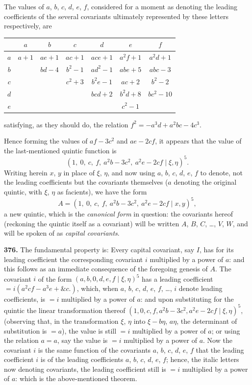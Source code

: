 \documentclass[12pt,a4paper]{article}
\begin{document}
The values of $a$, $b$, $c$, $d$, $e$, $f$, considered for a moment as denoting the leading coefficients of the several covariants ultimately represented by these letters respectively, are
\begin{center}
\begin{tabular}{c|cccccc}
& $a$ & $b$ & $c$ & $d$ & $e$ & $f$ \\[2pt]
\hline
$a$ & $a+1$ & $ae+1$ & $ac+1$ & $ace+1$ & $a^2 f+1$ & $a^2 d+1$ \\
$b$ & & $bd-4$ & $b^2-1$ & $ad^2-1$ & $abe+5$ & $abc-3$ \\
$c$ & & & $c^2+3$ & $b^2 e-1$ & $ac+2$ & $b^2-2$ \\
$d$ & & & & $bcd+2$ & $b^2 d+8$ & $bc^2-10$ \\
$e$ & & & & & $c^2-1$ &
\end{tabular}
\end{center}
satisfying, as they should do, the relation $f^2 = -a^3 d + a^2 bc - 4c^3$.

Hence forming the values of $af - 3c^2$ and $ae - 2cf$, it appears that the value of the last-mentioned quintic function is
\[
(1,\ 0,\ c,\ f,\ a^2 b - 3c^2,\ a^2 e - 2cf \mid \xi, \eta)^5.
\]
Writing herein $x$, $y$ in place of $\xi$, $\eta$, and now using $a$, $b$, $c$, $d$, $e$, $f$ to denote, not the leading coefficients but the covariants themselves ($a$ denoting the original quintic, with $\xi$, $\eta$ as facients), we have the form
\[
A = (1,\ 0,\ c,\ f,\ a^2 b - 3c^2,\ a^2 e - 2cf \mid x, y)^5,
\]
a new quintic, which is the \textit{canonical form} in question: the covariants hereof (reckoning the quintic itself as a covariant) will be written $A$, $B$, $C$, \ldots, $V$, $W$, and will be spoken of as \textit{capital covariants}.

\medskip

\noindent\textbf{376.} The fundamental property is: Every capital covariant, say $I$, has for its leading coefficient the corresponding covariant $i$ multiplied by a power of $a$: and this follows as an immediate consequence of the foregoing genesis of $A$. The covariant $i$ of the form $(a, b, 0, d, e, f \mid \xi, \eta)^5$ has a leading coefficient $= i(a^2 cf - a^3 e + \&c.)$, which, when $a$, $b$, $c$, $d$, $e$, $f$, \ldots, $i$ denote leading coefficients, is $= i$ multiplied by a power of $a$: and upon substituting for the quintic the linear transformation thereof $(1, 0, c, f, a^2 b - 3c^2, a^2 e - 2cf \mid \xi, \eta)^5$, (observing that, in the transformation $\xi$, $\eta$ into $\xi - b\eta$, $a\eta$, the determinant of substitution is $= a$), the value is still $= i$ multiplied by a power of $a$; or using the relation $a = a$, say the value is $= i$ multiplied by a power of $a$. Now the covariant $i$ is the same function of the covariants $a$, $b$, $c$, $d$, $e$, $f$ that the leading coefficient $i$ is of the leading coefficients $a$, $b$, $c$, $d$, $e$, $f$; hence, the italic letters now denoting covariants, the leading coefficient still is $= i$ multiplied by a power of $a$: which is the above-mentioned theorem.
\end{document}

